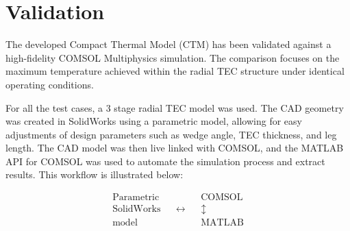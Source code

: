 \documentclass[10pt,a4paper,twocolumn]{article}
\begin{document}
\section{Validation}

The developed Compact Thermal Model (CTM) has been validated against a high-fidelity COMSOL Multiphysics simulation. The comparison focuses on the maximum temperature achieved within the radial TEC structure under identical operating conditions.

For all the test cases, a 3 stage radial TEC model was used. The CAD geometry was created in SolidWorks using a parametric model, allowing for easy adjustments of design parameters such as wedge angle, TEC thickness, and leg length. The CAD model was then live linked with COMSOL, and the MATLAB API for COMSOL was used to automate the simulation process and extract results. This workflow is illustrated below:

$$\begin{matrix}\mathrm{Parametric}&& && \mathrm{COMSOL}\\\mathrm{SolidWorks}&&\longleftrightarrow&&\updownarrow\\\mathrm{model}&&&&\mathrm{MATLAB}\end{matrix}$$
\end{document}
